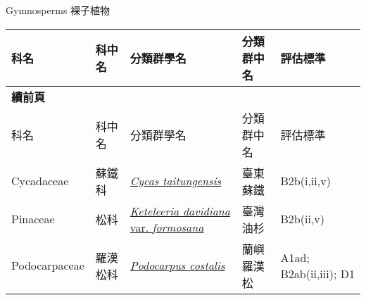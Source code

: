 \noindent\normalfont\selectfont Gymnosperms 裸子植物
\footnotesize\selectfont
        {\def\arraystretch{1.5}\tabcolsep=2pt
        \begin{longtable}{p{2.5cm}p{2.5cm}p{4.5cm}p{2.5cm}p{3cm}}
        \toprule
          科名 & 科中名 & 分類群學名 & 分類群中名 & 評估標準 \\
        \midrule 
        \endfirsthead

        {{\bfseries 續前頁 }} \\
        科名 & 科中名 & 分類群學名 & 分類群中名 & 評估標準 \\
        \midrule
        \endhead
                Cycadaceae & 蘇鐵科 & \href{http://www.theplantlist.org/tpl1.1/search?q=Cycas+taitungensis}{\textit{Cycas taitungensis} } & 臺東蘇鐵 & B2b(i,ii,v) \index{Cycas@\textit{Cycas}!taitungensis@\textit{taitungensis}}  \index{臺東蘇鐵} \\
    Pinaceae & 松科 & \href{http://www.theplantlist.org/tpl1.1/search?q=Keteleeria+davidiana+var.+formosana}{\textit{Keteleeria davidiana} var. \textit{formosana} } & 臺灣油杉 & B2b(ii,v) \index{Keteleeria@\textit{Keteleeria}!davidiana@\textit{davidiana}!var. formosana@var. \textit{formosana}}  \index{臺灣油杉} \\
    Podocarpaceae & 羅漢松科 & \href{http://www.theplantlist.org/tpl1.1/search?q=Podocarpus+costalis}{\textit{Podocarpus costalis} } & 蘭嶼羅漢松 & A1ad; B2ab(ii,iii); D1 \index{Podocarpus@\textit{Podocarpus}!costalis@\textit{costalis}}  \index{蘭嶼羅漢松} \\
    \bottomrule
        \end{longtable}
        }
    